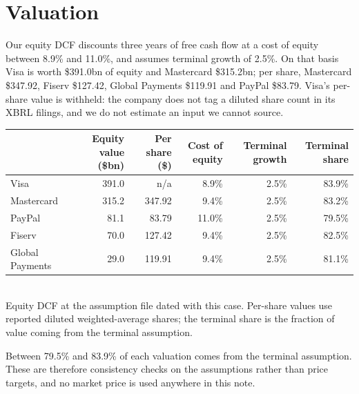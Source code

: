 \documentclass[10pt]{article}
\begin{document}
\section*{Valuation}
Our equity DCF discounts three years of free cash flow at a cost of equity between 8.9\% and 11.0\%, and assumes terminal growth of 2.5\%. On that basis Visa is worth \$391.0bn of equity and Mastercard \$315.2bn; per share, Mastercard \$347.92, Fiserv \$127.42, Global Payments \$119.91 and PayPal \$83.79. Visa's per-share value is withheld: the company does not tag a diluted share count in its XBRL filings, and we do not estimate an input we cannot source.\par
\begin{center}\footnotesize
\begin{tabular}{lrrrrr}
\toprule
\textbf{} & \textbf{Equity value (\$bn)} & \textbf{Per share (\$)} & \textbf{Cost of equity} & \textbf{Terminal growth} & \textbf{Terminal share} \\
\midrule
Visa & 391.0 & n/a & 8.9\% & 2.5\% & 83.9\% \\
Mastercard & 315.2 & 347.92 & 9.4\% & 2.5\% & 83.2\% \\
PayPal & 81.1 & 83.79 & 11.0\% & 2.5\% & 79.5\% \\
Fiserv & 70.0 & 127.42 & 9.4\% & 2.5\% & 82.5\% \\
Global Payments & 29.0 & 119.91 & 9.4\% & 2.5\% & 81.1\% \\
\bottomrule
\end{tabular}
\\[1pt]{\scriptsize\color{black!65}Equity DCF at the assumption file dated with this case. Per-share values use reported diluted weighted-average shares; the terminal share is the fraction of value coming from the terminal assumption.}
\end{center}
Between 79.5\% and 83.9\% of each valuation comes from the terminal assumption. These are therefore consistency checks on the assumptions rather than price targets, and no market price is used anywhere in this note.\par
\end{document}
